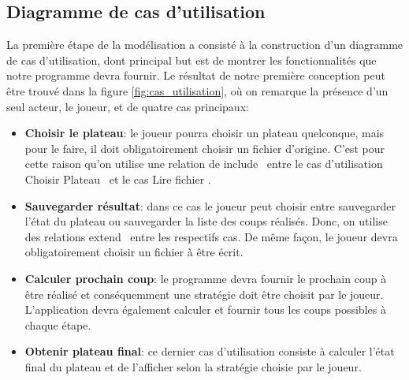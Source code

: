 \documentclass{article}
\begin{document}
\subsection{Diagramme de cas d'utilisation}

La première étape de la modélisation a consisté à la construction d'un diagramme
de cas d’utilisation, dont principal but est de montrer les fonctionnalités que
notre programme devra fournir. Le résultat de notre première conception peut
être trouvé dans la figure \ref{fig:cas_utilisation}, où on remarque la présence
d’un seul acteur, le joueur, et de quatre cas principaux:

\vspace{12pt}

\begin{itemize}
  
  \item \textbf{Choisir le plateau}: le joueur pourra choisir un plateau
  quelconque, mais pour le faire, il doit obligatoirement choisir un
  fichier d'origine.  C'est pour cette raison qu'on utilise une relation de \og
  include \fg ~entre le cas d'utilisation \og Choisir Plateau \fg ~et le cas
  \og Lire fichier \fg.
  
  \vspace{12pt}
  
  \item \textbf{Sauvegarder résultat}: dans ce cas le joueur peut choisir entre
  sauvegarder l’état du plateau ou sauvegarder la liste des coups réalisés.
  Donc, on utilise des relations \og extend \fg ~entre les respectifs cas. De
  même façon, le joueur devra obligatoirement choisir un fichier à être écrit.
  
  \vspace{12pt}
  
  \item \textbf{Calculer prochain coup}: le programme devra fournir
  le prochain coup à être réalisé et conséquemment une stratégie doit être
  choisit par le joueur. L'application devra également calculer et fournir tous
  les coups possibles à chaque étape.
  
  \vspace{12pt}
  
  \item \textbf{Obtenir plateau final}: ce dernier cas d’utilisation consiste à
  calculer l’état final du plateau et de l’afficher selon la stratégie choisie
  par le joueur.
\end{itemize}
\end{document}
